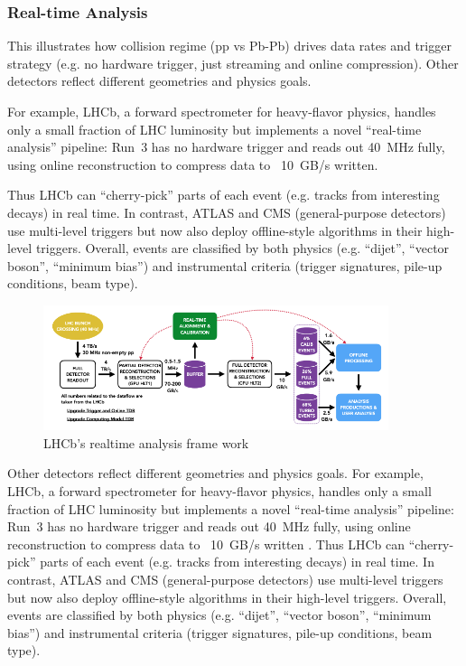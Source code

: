 \documentclass[letterpaper,12pt]{article}
\begin{document}
\begin{spacing}{1.125}
\subsubsection{Real-time Analysis}
This illustrates how collision regime (pp vs Pb-Pb) drives data rates and trigger strategy (e.g. no hardware trigger, just streaming and online compression). Other detectors reflect different geometries and physics goals.

For example, LHCb, a forward spectrometer for heavy-flavor physics, handles only a small fraction of LHC luminosity but implements a novel “real-time analysis” pipeline: Run 3 has no hardware trigger and reads out 40 MHz fully, using online reconstruction to compress data to ~10 GB/s written.

Thus LHCb can “cherry-pick” parts of each event (e.g. tracks from interesting decays) in real time. In contrast, ATLAS and CMS (general-purpose detectors) use multi-level triggers but now also deploy offline-style algorithms in their high-level triggers. Overall, events are classified by both physics (e.g. “dijet”, “vector boson”, “minimum bias”) and instrumental criteria (trigger signatures, pile-up conditions, beam type).

\begin{figure}[H]
  \center
  \includegraphics[width=0.9\textwidth]{lhcb}
  \caption{LHCb's realtime analysis frame work}
\end{figure}

Other detectors reflect different geometries and physics goals. For example, LHCb, a forward spectrometer for heavy-flavor physics, handles only a small fraction of LHC luminosity but implements a novel “real-time analysis” pipeline: Run 3 has no hardware trigger and reads out 40 MHz fully, using online reconstruction to compress data to ~10 GB/s written
. Thus LHCb can “cherry-pick” parts of each event (e.g. tracks from interesting decays) in real time. In contrast, ATLAS and CMS (general-purpose detectors) use multi-level triggers but now also deploy offline-style algorithms in their high-level triggers. Overall, events are classified by both physics (e.g. “dijet”, “vector boson”, “minimum bias”) and instrumental criteria (trigger signatures, pile-up conditions, beam type).


\end{spacing}
\end{document}
